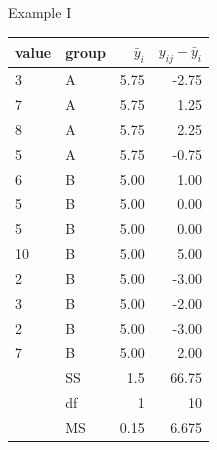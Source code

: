 \begin{frame}{Example I}

\begin{tabular}{ll|rr}
  value & group & $\bar y_i$ & $y_{ij}-\bar y_i$  \\ 
  \hline
3   &  A  &  5.75  &  -2.75      \\
7   &  A  &  5.75  &  1.25       \\
8   &  A  &  5.75  &  2.25       \\
5   &  A  &  5.75  &  -0.75      \\
6   &  B  &  5.00     &  1.00          \\
5   &  B  &  5.00     &  0.00          \\
5   &  B  &  5.00     &  0.00          \\
10  &  B  &  5.00     &  5.00          \\
2   &  B  &  5.00     &  -3.00         \\
3   &  B  &  5.00     &  -2.00         \\
2   &  B  &  5.00     &  -3.00         \\
7   &  B  &  5.00     &  2.00        \\
   \hline
   & SS & 1.5 & 66.75 \\ 
   & df & 1 & 10 \\ 
   & MS & 0.15 & 6.675   \\ 
\end{tabular}

\end{frame}

